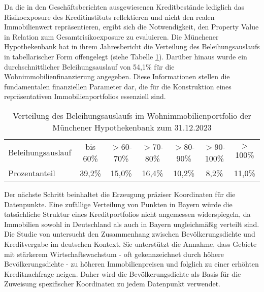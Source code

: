 \begin{sloppypar}
Da die in den Geschäftsberichten ausgewiesenen Kreditbestände lediglich das Risikoexposure des Kreditinstituts reflektieren und nicht den realen Immobilienwert repräsentieren, ergibt sich die Notwendigkeit, den Property Value in Relation zum Gesamtrisikoexposure zu evaluieren.
Die Münchener Hypothekenbank hat in ihrem Jahresbericht die Verteilung des Beleihungsauslaufs in tabellarischer Form offengelegt (siehe Tabelle \ref{tab:beleihungsauslauf2023}). Darüber hinaus wurde ein durchschnittlicher Beleihungsauslauf von 54,1\% für die Wohnimmobilienfinanzierung angegeben.
Diese Informationen stellen die fundamentalen finanziellen Parameter dar, die für die Konstruktion eines repräsentativen Immobilienportfolios essenziell sind.
\begin{table}[htbp]
    \centering
    \caption{Verteilung des Beleihungsauslaufs im Wohnimmobilienportfolio der Münchener Hypothekenbank zum 31.12.2023}
    \label{tab:beleihungsauslauf2023}
    \begin{tabular}{lcccccc}
    \toprule[0.5pt]
    Beleihungsauslauf & bis 60\% & $>$60-70\% & $>$70-80\% & $>$80-90\% & $>$90-100\% & $>$100\% \\
    Prozentanteil & 39,2\% & 15,0\% & 16,4\% & 10,2\% & 8,2\% & 11,0\% \\
    \bottomrule[1.5pt]
    \end{tabular}
\end{table}

Der nächste Schritt beinhaltet die Erzeugung präziser Koordinaten für die Datenpunkte. Eine zufällige Verteilung von Punkten in Bayern würde die tatsächliche Struktur eines Kreditportfolios nicht angemessen widerspiegeln, da Immobilien sowohl in Deutschland als auch in Bayern ungleichmäßig verteilt sind. Die Studie von \textcite{zurek2022real} untersucht den Zusammenhang zwischen Bevölkerungsdichte und Kreditvergabe im deutschen Kontext. Sie unterstützt die Annahme, dass Gebiete mit stärkerem Wirtschaftswachstum - oft gekennzeichnet durch höhere Bevölkerungsdichte - zu höheren Immobilienpreisen und folglich zu einer erhöhten Kreditnachfrage neigen. Daher wird die Bevölkerungsdichte als Basis für die Zuweisung spezifischer Koordinaten zu jedem Datenpunkt verwendet.

\end{sloppypar}

